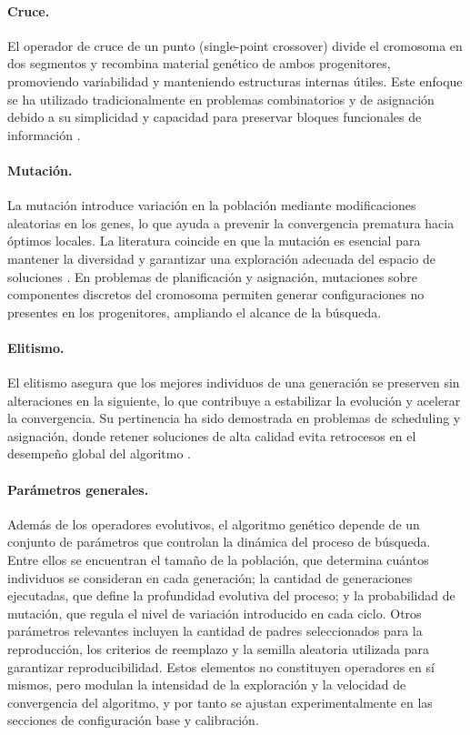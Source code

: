 \paragraph{Cruce.}
El operador de cruce de un punto (single-point crossover) divide el cromosoma en dos segmentos 
y recombina material genético de ambos progenitores, promoviendo variabilidad y manteniendo 
estructuras internas útiles. Este enfoque se ha utilizado tradicionalmente en problemas combinatorios 
y de asignación debido a su simplicidad y capacidad para preservar bloques funcionales de 
información \cite{ref3,ref10}.

\paragraph{Mutación.}
La mutación introduce variación en la población mediante modificaciones aleatorias en los genes, lo que 
ayuda a prevenir la convergencia prematura hacia óptimos locales. La literatura coincide en que la
mutación es esencial para mantener la diversidad y garantizar una exploración adecuada del espacio 
de soluciones \cite{ref3,ref4}. En problemas de planificación y asignación, mutaciones sobre componentes 
discretos del cromosoma permiten generar configuraciones no presentes en los progenitores, ampliando 
el alcance de la búsqueda.

\paragraph{Elitismo.}
El elitismo asegura que los mejores individuos de una generación se preserven sin alteraciones en la 
siguiente, lo que contribuye a estabilizar la evolución y acelerar la convergencia. Su pertinencia ha 
sido demostrada en problemas de scheduling y asignación, donde retener soluciones de alta calidad evita 
retrocesos en el desempeño global del algoritmo \cite{Delgado2005}.

\paragraph{Parámetros generales.}
Además de los operadores evolutivos, el algoritmo genético depende de un conjunto de parámetros 
que controlan la dinámica del proceso de búsqueda. Entre ellos se encuentran el tamaño de la 
población, que determina cuántos individuos se consideran en cada generación; la cantidad de 
generaciones ejecutadas, que define la profundidad evolutiva del proceso; y la probabilidad de 
mutación, que regula el nivel de variación introducido en cada ciclo. Otros parámetros relevantes 
incluyen la cantidad de padres seleccionados para la reproducción, los criterios de reemplazo y la 
semilla aleatoria utilizada para garantizar reproducibilidad. Estos elementos no constituyen 
operadores en sí mismos, pero modulan la intensidad de la exploración y la velocidad de 
convergencia del algoritmo, y por tanto se ajustan experimentalmente en las secciones de 
configuración base y calibración.

